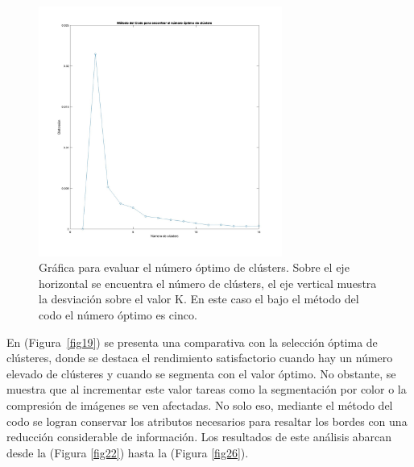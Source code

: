 \begin{figure}
		\includegraphics[width=8cm]{images/F18.jpg} 
\caption{Gráfica para evaluar el número óptimo de clústers. Sobre el eje horizontal se encuentra el número de clústers, el eje vertical muestra la desviación sobre el valor K. En este caso el bajo el método del codo el número óptimo es cinco.}
\label{fig18}
\end{figure}

En (Figura~\ref{fig19}) se presenta una comparativa con la selección óptima de clústeres, donde se destaca el rendimiento satisfactorio cuando hay un número elevado de clústeres y cuando se segmenta con el valor óptimo. No obstante, se muestra que al incrementar este valor tareas como la segmentación por color o la compresión de imágenes se ven afectadas. No solo eso, mediante el método del codo se logran conservar los atributos necesarios para resaltar los bordes con una reducción considerable de información. Los resultados de este análisis abarcan desde la (Figura \ref{fig22}) hasta la (Figura \ref{fig26}).


